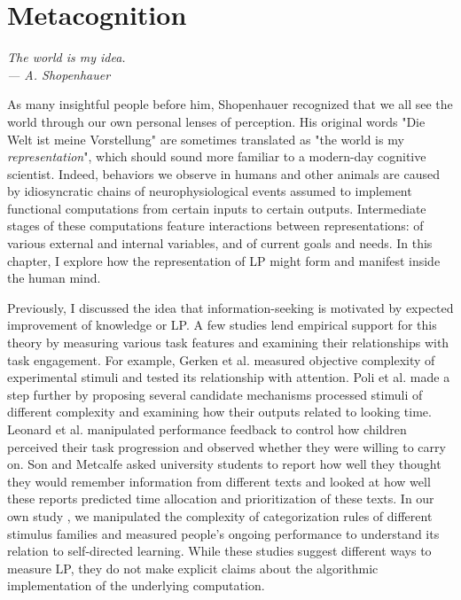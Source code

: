 \chapter{Metacognition}\label{ch:metacognition}

\begin{flushright}{\slshape
    The world is my idea. \\
    --- A. Shopenhauer \cite{schopenhauer_world_2016}}
\end{flushright}
As many insightful people before him, Shopenhauer recognized that we all see the world through our own personal lenses of perception. His original words "Die Welt ist meine Vorstellung" are sometimes translated as "the world is my \emph{representation}", which should sound more familiar to a modern-day cognitive scientist. Indeed, behaviors we observe in humans and other animals are caused by idiosyncratic chains of neurophysiological events assumed to implement functional computations from certain inputs to certain outputs. Intermediate stages of these computations feature interactions between representations: of various external and internal variables, and of current goals and needs. In this chapter, I explore how the representation of \acf{LP} might form and manifest inside the human mind. 

Previously, I discussed the idea that information-seeking is motivated by expected improvement of knowledge or \ac{LP}. A few studies lend empirical support for this theory by measuring various task features and examining their relationships with task engagement. For example, Gerken et al. \cite{gerken_infants_2011} measured objective complexity of experimental stimuli and tested its relationship with attention. Poli et al. \cite{poli_infants_2020} made a step further by proposing several candidate mechanisms processed stimuli of different complexity and examining how their outputs related to looking time. Leonard et al. \cite{leonard_young_2021} manipulated performance feedback to control how children perceived their task progression and observed whether they were willing to carry on. Son and Metcalfe \cite{son_metacognitive_2000} asked university students to report how well they thought they would remember information from different texts and looked at how well these reports predicted time allocation and prioritization of these texts. In our own study \cite{ten_humans_2021}, we manipulated the complexity of categorization rules of different stimulus families and measured people's ongoing performance to understand its relation to self-directed learning. While these studies suggest different ways to measure \ac{LP}, they do not make explicit claims about the algorithmic implementation of the underlying computation.

